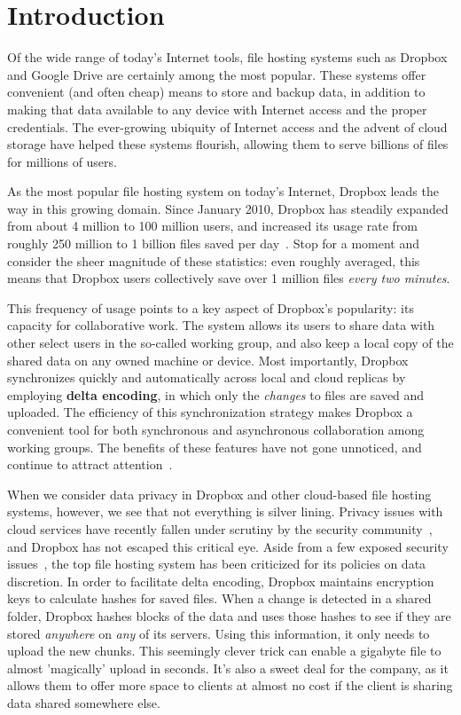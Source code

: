 \section{Introduction}
\label{introduction}
Of the wide range of today's Internet tools,
file hosting systems such as Dropbox and Google Drive are certainly among the most popular.
These systems offer convenient (and often cheap) means
to store and backup data, in addition to making that data available
to any device with Internet access and the proper credentials.
The ever-growing ubiquity of Internet access
and the advent of cloud storage have helped
these systems flourish,
allowing them to serve billions of files for millions of users.

As the most popular file hosting system on today's Internet,
Dropbox leads the way in this growing domain.
Since January 2010, Dropbox has steadily expanded from about 4 million to 100 million users,
and increased its usage rate from roughly 250 million to 1 billion files saved per day~\cite{dropboxstats}.
Stop for a moment and consider the sheer magnitude of these statistics:
even roughly averaged, this means that Dropbox users collectively save over
1 million files \emph{every two minutes}.

This frequency of usage points to a key aspect of Dropbox's popularity:
its capacity for collaborative work.
The system allows its users to share data with other select users
in the so-called working group, and also keep a local copy
of the shared data on any owned machine or device.
Most importantly, Dropbox synchronizes quickly and automatically across local and cloud replicas
by employing \textbf{delta encoding},
in which only the \emph{changes} to files are saved and uploaded.
The efficiency of this synchronization strategy makes Dropbox a convenient tool
for both synchronous and asynchronous collaboration among working groups.
The benefits of these features have not gone
unnoticed, and continue to attract attention~\cite{dropboxmercurial,dropboxcollab}.

When we consider data privacy in Dropbox and other cloud-based file hosting systems, however, we see that not everything is silver lining.
Privacy issues with cloud services have recently
fallen under scrutiny by the security community~\cite{van2010impossibility,soghoian2010caught}, and Dropbox has not escaped this critical eye.
Aside from a few exposed security issues~\cite{mulazzani2011dark,dropboxsecurity},
the top file hosting system has been criticized for its policies on data discretion.
In order to facilitate delta encoding,
Dropbox maintains encryption keys to calculate hashes for saved files. When a change is detected in a shared folder,
Dropbox hashes blocks of the data and uses those hashes to see if they are stored \emph{anywhere} on \emph{any} of its servers.
Using this information, it only needs to upload the new chunks. This seemingly clever trick can enable a gigabyte file to almost 'magically'
upload in seconds. It's also a sweet deal for the company, as it allows them to offer more space to clients at almost no cost if the client is sharing
data shared somewhere else. 

